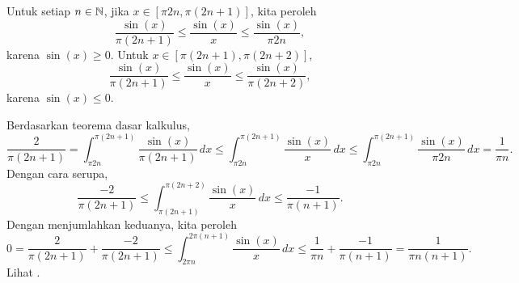 \begin{example}
Untuk setiap $n \in {\mathbb{N}}$, jika $x \in [\pi 2n, \pi (2n+1)]$, kita peroleh
\begin{equation*}
\frac{\sin(x)}{\pi (2n+1)}
\leq
\frac{\sin(x)}{x}
\leq
\frac{\sin(x)}{\pi 2n} ,
\end{equation*}
karena $\sin(x) \geq 0$.  Untuk $x \in [\pi (2n+1), \pi (2n+2)]$,
\begin{equation*}
\frac{\sin(x)}{\pi (2n+1)}
\leq
\frac{\sin(x)}{x}
\leq
\frac{\sin(x)}{\pi (2n+2)} ,
\end{equation*}
karena $\sin(x) \leq 0$.

Berdasarkan teorema dasar kalkulus,
\begin{equation*}
\frac{2}{\pi (2n+1)}
=
\int_{\pi 2n}^{\pi (2n+1)}
\frac{\sin(x)}{\pi (2n+1)}
\,dx
\leq
\int_{\pi 2n}^{\pi (2n+1)}
\frac{\sin(x)}{x}
\,dx
\leq
\int_{\pi 2n}^{\pi (2n+1)}
\frac{\sin(x)}{\pi 2n}
\,dx
=
\frac{1}{\pi n} .
\end{equation*}
Dengan cara serupa,
\begin{equation*}
\frac{-2}{\pi (2n+1)}
\leq
\int_{\pi (2n+1)}^{\pi (2n+2)}
\frac{\sin(x)}{x}
\,dx
\leq
\frac{-1}{\pi (n+1)} .
\end{equation*}
Dengan menjumlahkan keduanya, kita peroleh
\begin{equation*}
0
=
\frac{2}{\pi (2n+1)}
+
\frac{-2}{\pi (2n+1)}
\leq
\int_{2\pi n}^{2\pi (n+1)}
\frac{\sin(x)}{x}
\,dx
\leq
\frac{1}{\pi n} 
+
\frac{-1}{\pi (n+1)} 
=
\frac{1}{\pi n(n+1)} .
\end{equation*}
Lihat .
\begin{myfigureht}
\end{myfigureht}
\end{example}
